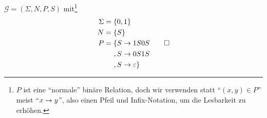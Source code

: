 \begin{Bsp}\label{bsp:3.sameNumber}
  $\mathcal{G} = (\Sigma, N, P, S)$ mit\footnote{$P$ ist eine "`normale"' binäre Relation, 
  doch wir verwenden statt "`$(x,y)\in P$"' meist "`$x\-> y$"', also einen Pfeil und Infix-Notation, um die Lesbarkeit zu erhöhen.}
	\begin{align*}
		\Sigma &= \{ 0, 1 \}\\
		N &= \{S\}\\
		P &= \begin{aligned}[t]
      \{ S & \to 1S0S \\
      , S & \to 0S1S \\
       , S & \to \varepsilon
      \}
        \end{aligned}
      \qedhere
	\end{align*}
\end{Bsp}
% 
%   
